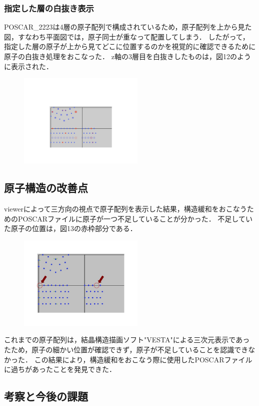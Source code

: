 \subsubsection{指定した層の白抜き表示}
POSCAR\_2223は4層の原子配列で構成されているため，原子配列を上から見た図，すなわち平面図では，原子同士が重なって配置してしまう．
したがって，指定した層の原子が上から見てどこに位置するのかを視覚的に確認できるために原子の白抜き処理をおこなった．
z軸の3層目を白抜きしたものは，図12のように表示された．

\begin{figure}[htbp]\begin{center}
\includegraphics[width=6cm,bb=0 0 442 432]{../figs/./boundary_narita.012.jpg}
\caption{}
\label{default}\end{center}\end{figure}
\subsection{原子構造の改善点}
viewerによって三方向の視点で原子配列を表示した結果，構造緩和をおこなうためのPOSCARファイルに原子が一つ不足していることが分かった．
不足していた原子の位置は，図13の赤枠部分である．

\begin{figure}[htbp]\begin{center}
\includegraphics[width=6cm,bb=0 0 442 432]{../figs/./boundary_narita.013.jpg}
\caption{}
\label{default}\end{center}\end{figure}
これまでの原子配列は，結晶構造描画ソフト"VESTA"による三次元表示であったため，原子の細かい位置が確認できず，原子が不足していることを認識できなかった．
この結果により，構造緩和をおこなう際に使用したPOSCARファイルに過ちがあったことを発見できた．

\subsection{考察と今後の課題}
